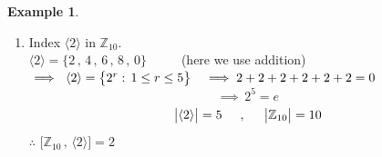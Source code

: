\documentclass[11pt,a4paper]{article}
\theoremstyle{definition}
\newtheorem{exa}[thm]{Example}
\begin{document}
\begin{exa}
\begin{enumerate}
\item Index $\langle 2\rangle$ in $\mathbb{Z}_{10}$.\\
$\langle 2\rangle = \{2\, , \, 4\, , \, 6\, , \, 8\, , \, 0\}\hspace{1cm}$ (here we use addition)\\
$\implies\, \, \langle 2\rangle = \big\{2^r:\, 1\leq r\leq 5\big\}\hspace{0.3cm}\implies 2 + 2 + 2 + 2+ 2 + 2 = 0$\\
$$\implies \, 2^5 = e$$
$$\begin{vmatrix}
\langle 2\rangle\\
\end{vmatrix} = 5\hspace{0.5cm},\hspace{0.5cm}\begin{vmatrix}
\mathbb{Z}_{10}\\
\end{vmatrix} = 10$$
$\therefore\,\, \big[\mathbb{Z}_{10}\, , \, \langle 2\rangle\big] = 2$\\\\
\end{enumerate}
\end{exa}
\end{document}
